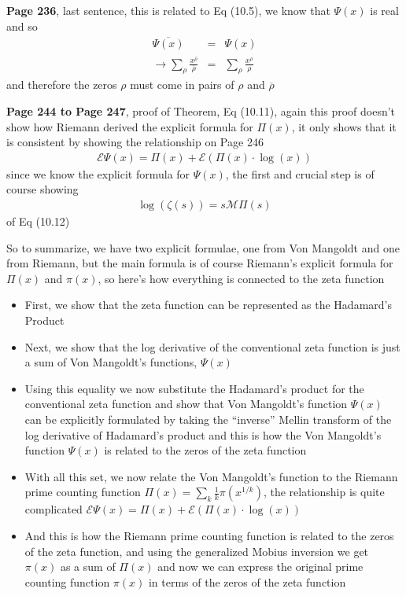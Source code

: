 \documentclass[aps,preprint,preprintnumbers,nofootinbib,showpacs,prd]{revtex4-1}
\newcommand{\bit}{\begin{itemize}}
\newcommand{\eit}{\end{itemize}}
\newcommand{\nbea}{\begin{eqnarray*}}
\newcommand{\neea}{\end{eqnarray*}}
\begin{document}
{\bf Page 236}, last sentence, this is related to Eq (10.5), we know that $\Psi(x)$ is real and so
%
\nbea
\overline{\Psi(x)} & = & \Psi(x) \\
\to \sum_\rho \frac{x^{\overline\rho}}{\overline\rho} & = & \sum_\rho \frac{x^{\rho}}{\rho}
\neea
%
and therefore the zeros $\rho$ must come in pairs of $\rho$ and $\overline\rho$

{\bf Page 244 to Page 247}, proof of Theorem, Eq (10.11), again this proof doesn't show how Riemann derived the explicit formula for $\Pi(x)$, it only shows that it is consistent by showing the relationship on Page 246
%
\nbea
\mathcal{E}\Psi(x) = \Pi(x) + \mathcal{E}(\Pi(x)\cdot\log(x))
\neea
%
since we know the explicit formula for $\Psi(x)$, the first and crucial step is of course showing
%
\nbea
\log(\zeta(s)) = s\mathcal{M}\Pi(s)
\neea
%
of Eq (10.12)

So to summarize, we have two explicit formulae, one from Von Mangoldt and one from Riemann, but the main formula is of course Riemann's explicit formula for $\Pi(x)$ and $\pi(x)$, so here's how everything is connected to the zeta function
\bit
\item First, we show that the zeta function can be represented as the Hadamard's Product
\item Next, we show that the log derivative of the conventional zeta function is just a sum of Von Mangoldt's functions, $\Psi(x)$
\item Using this equality we now substitute the Hadamard's product for the conventional zeta function and show that Von Mangoldt's function $\Psi(x)$ can be explicitly formulated by taking the ``inverse'' Mellin transform of the log derivative of Hadamard's product and this is how the Von Mangoldt's function $\Psi(x)$ is related to the zeros of the zeta function
\item With all this set, we now relate the Von Mangoldt's function to the Riemann prime counting function $\Pi(x) = \sum_k \frac{1}{k}\pi(x^{1/k})$, the relationship is quite complicated $\mathcal{E}\Psi(x) = \Pi(x) + \mathcal{E}(\Pi(x)\cdot\log(x))$
\item And this is how the Riemann prime counting function is related to the zeros of the zeta function, and using the generalized Mobius inversion we get $\pi(x)$ as a sum of $\Pi(x)$ and now we can express the original prime counting function $\pi(x)$ in terms of the zeros of the zeta function
\eit
\end{document}
